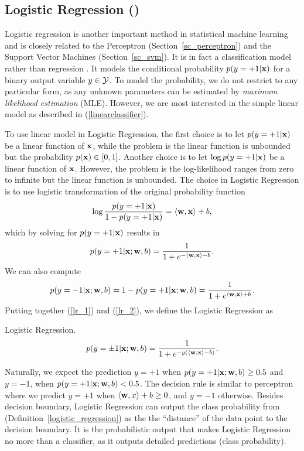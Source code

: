 {%
\subsection{Logistic Regression (\lr)}\label{sc_lr}

Logistic regression is another important method in statistical machine learning and is closely related to the Perceptron (Section~\ref{sc_perceptron}) and the Support Vector Machines (Section~\ref{sc_svm}).
It is in fact a classification model rather than regression \citep{Bishop07}.
It models the conditional probability $p(y=+1|\mathbf {x})$ for a binary output variable $y\in\mathcal{Y}$.
To model the probability, we do not restrict to any particular form, as any unknown parameters can be estimated by \textit{maximum likelihood estimation} (MLE).
However, we are most interested in the simple linear model as described in (\ref{linearclassifier}).

To use linear model in Logistic Regression, the first choice is to let $p(y=+1|\mathbf {x})$ be a linear function of $\mathbf {x}$, while the problem is the linear function is unbounded but the probability $p(\mathbf {x})\in[0,1]$.
Another choice is to let $\log p(y=+1|\mathbf {x})$ be a linear function of $\mathbf {x}$. 
However, the problem is the log-likelihood ranges from zero to infinite but the linear function is unbounded.
The choice in Logistic Regression is to use logistic transformation of the original probability function
\begin{align*}
	\log\frac{p(y=+1|\mathbf {x})}{1-p(y=+1|\mathbf {x})} = \langle \mathbf {w}, \mathbf {x} \rangle + b,
\end{align*}
which by solving for $p(y=+1|\mathbf {x})$ results in 
\begin{align}
	p(y=+1|\mathbf {x};\mathbf {w},b) = \frac{1}{1+e^{ -\langle \mathbf {w}, \mathbf {x} \rangle-b }}. \label{lr_1}
\end{align}
We can also compute
\begin{align}
	p(y=-1|\mathbf {x};\mathbf {w},b)=1-p(y=+1|\mathbf {x};\mathbf {w},b)=\frac{1}{1+e^{ \langle \mathbf {w}, \mathbf {x} \rangle+b }}. \label{lr_2}
\end{align}
Putting together (\ref{lr_1}) and (\ref{lr_2}), we define the Logistic Regression as
\begin{definition}{Logistic Regression.}\label{logistic_regression}
	\begin{align*}
		p(y=\pm1|\mathbf {x};\mathbf {w},b) = \frac{1}{1+e^{ -y(\langle \mathbf {w}, \mathbf {x} \rangle-b) }}.
	\end{align*}
\end{definition}
Naturally, we expect the prediction $y=+1$ when $p(y=+1|\mathbf {x};\mathbf {w},b)\ge0.5$ and $y=-1$, when $p(y=+1|\mathbf {x};\mathbf {w},b)<0.5$.
The decision rule is similar to perceptron where we predict $y=+1$ when $\langle \mathbf {w}, x \rangle+b\ge0$, and $y=-1$ otherwise.
Besides decision boundary, Logistic Regression can output the class probability from (Definition~\ref{logistic_regression}) as the the ``distance'' of the data point to the decision boundary.
It is the probabilistic output that makes Logistic Regression no more than a classifier, as it outputs detailed predictions (class probability).

}
